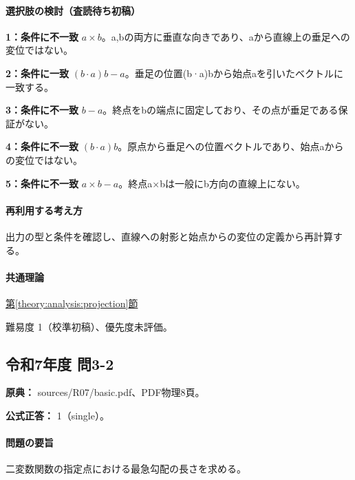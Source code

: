 \paragraph{選択肢の検討（査読待ち初稿）}\mbox{}\par

\noindent\textbf{1：条件に不一致} \(a\times b\)。a,bの両方に垂直な向きであり、aから直線上の垂足への変位ではない。\par

\noindent\textbf{2：条件に一致} \((b\cdot a)b-a\)。垂足の位置(b·a)bから始点aを引いたベクトルに一致する。\par

\noindent\textbf{3：条件に不一致} \(b-a\)。終点をbの端点に固定しており、その点が垂足である保証がない。\par

\noindent\textbf{4：条件に不一致} \((b\cdot a)b\)。原点から垂足への位置ベクトルであり、始点aからの変位ではない。\par

\noindent\textbf{5：条件に不一致} \(a\times b-a\)。終点a×bは一般にb方向の直線上にない。\par

\paragraph{再利用する考え方} 出力の型と条件を確認し、直線への射影と始点からの変位の定義から再計算する。

\paragraph{共通理論} \hyperref[theory:analysis:projection]{第\ref*{theory:analysis:projection}節}

\par 難易度 1（校準初稿）、優先度未評価。

\subsection{令和7年度 問3-2}
\label{q:r07-reg-basic-3-2}

\noindent\textbf{原典：} sources/R07/basic.pdf、PDF物理8頁。

\textbf{公式正答：} 1（single）。

\paragraph{問題の要旨} 二変数関数の指定点における最急勾配の長さを求める。

